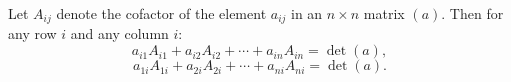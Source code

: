 Let $A_{ij}$ denote the cofactor of the element $a_{ij}$ in an $n \times n$ matrix $(a)$. Then for any row $i$ and any column $i$:
$$a_{i1}A_{i1} + a_{i2}A_{i2} + \cdots + a_{in}A_{in} = \det(a),$$
$$a_{1i}A_{1i} + a_{2i}A_{2i} + \cdots + a_{ni}A_{ni} = \det(a).$$
